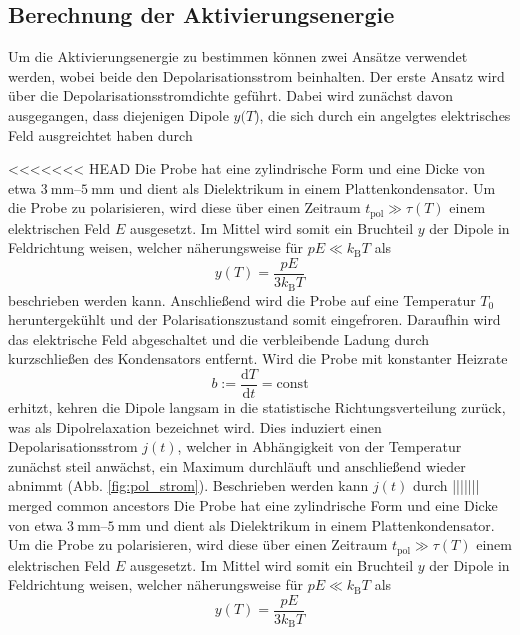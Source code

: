 \subsection{Berechnung der Aktivierungsenergie}
\label{sec:Aktivierungsenergie}

Um die Aktivierungsenergie zu bestimmen können zwei Ansätze verwendet werden,
wobei beide den Depolarisationsstrom beinhalten.
Der erste Ansatz wird über die Depolarisationsstromdichte
geführt. Dabei wird zunächst davon ausgegangen, dass diejenigen Dipole $y(T$), die 
sich durch ein angelgtes elektrisches Feld ausgreichtet haben durch 

<<<<<<< HEAD
Die Probe hat eine zylindrische Form und eine Dicke von etwa $\SIrange{3}{5}{\milli\meter}$ und dient als Dielektrikum in einem Plattenkondensator.
Um die Probe zu polarisieren, wird diese über einen Zeitraum $t_{\text{pol}} \gg \tau(T)$ einem elektrischen Feld $E$ ausgesetzt.
Im Mittel wird somit ein Bruchteil $y$ der Dipole in Feldrichtung weisen, welcher näherungsweise für $pE \ll k_\text{B} T$ als
\begin{equation}
    y(T) = \frac{p E}{3 k_\text{B} T} \label{y_t}
\end{equation}
beschrieben werden kann.
Anschließend wird die Probe auf eine Temperatur $T_0$ heruntergekühlt und der Polarisationszustand somit eingefroren.
Daraufhin wird das elektrische Feld abgeschaltet und die verbleibende Ladung durch kurzschließen des Kondensators entfernt.
Wird die Probe mit konstanter Heizrate
\begin{equation}
    b := \frac{\mathrm{d}T}{\mathrm{d}t} = \text{const}
\end{equation}
erhitzt, kehren die Dipole langsam in die statistische Richtungsverteilung zurück, was als Dipolrelaxation bezeichnet wird.
Dies induziert einen Depolarisationsstrom $j(t)$, welcher in Abhängigkeit von der Temperatur zunächst steil anwächst, ein Maximum durchläuft und anschließend wieder abnimmt (Abb. \ref{fig:pol_strom}).
Beschrieben werden kann $j(t)$ durch
||||||| merged common ancestors
Die Probe hat eine zylindrische Form und eine Dicke von etwa $\SIrange{3}{5}{\milli\meter}$ und dient als Dielektrikum in einem Plattenkondensator.
Um die Probe zu polarisieren, wird diese über einen Zeitraum $t_{\text{pol}} \gg \tau(T)$ einem elektrischen Feld $E$ ausgesetzt.
Im Mittel wird somit ein Bruchteil $y$ der Dipole in Feldrichtung weisen, welcher näherungsweise für $pE \ll k_\text{B} T$ als
\begin{equation}
    y(T) = \frac{p E}{3 k_\text{B} T} \label{y_t}
\end{equation}
